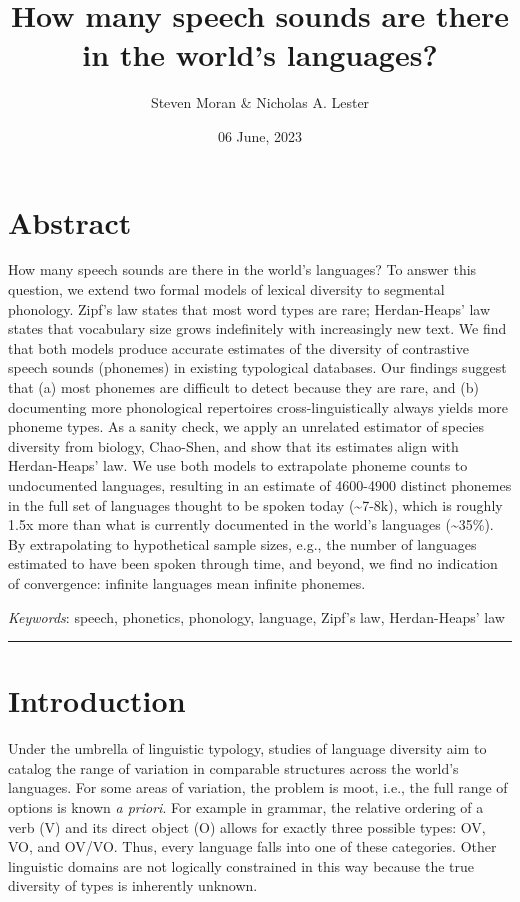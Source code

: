 \documentclass[
]{article}
\title{How many speech sounds are there in the world's languages?}
\author{Steven Moran \& Nicholas A. Lester}
\date{06 June, 2023}
\begin{document}
\maketitle

\hypertarget{abstract}{%
\section*{Abstract}\label{abstract}}

How many speech sounds are there in the world's languages? To answer
this question, we extend two formal models of lexical diversity to
segmental phonology. Zipf's law states that most word types are rare;
Herdan-Heaps' law states that vocabulary size grows indefinitely with
increasingly new text. We find that both models produce accurate
estimates of the diversity of contrastive speech sounds (phonemes) in
existing typological databases. Our findings suggest that (a) most
phonemes are difficult to detect because they are rare, and (b)
documenting more phonological repertoires cross-linguistically always
yields more phoneme types. As a sanity check, we apply an unrelated
estimator of species diversity from biology, Chao-Shen, and show that
its estimates align with Herdan-Heaps' law. We use both models to
extrapolate phoneme counts to undocumented languages, resulting in an
estimate of 4600-4900 distinct phonemes in the full set of languages
thought to be spoken today (\textasciitilde7-8k), which is roughly 1.5x
more than what is currently documented in the world's languages
(\textasciitilde35\%). By extrapolating to hypothetical sample sizes,
e.g., the number of languages estimated to have been spoken through
time, and beyond, we find no indication of convergence: infinite
languages mean infinite phonemes.

\emph{Keywords}: speech, phonetics, phonology, language, Zipf's law,
Herdan-Heaps' law

\begin{center}\rule{0.5\linewidth}{0.5pt}\end{center}

\hypertarget{introduction}{%
\section{Introduction}\label{introduction}}

Under the umbrella of linguistic typology, studies of language diversity
aim to catalog the range of variation in comparable structures across
the world's languages. For some areas of variation, the problem is moot,
i.e., the full range of options is known \emph{a priori}. For example in
grammar, the relative ordering of a verb (V) and its direct object (O)
allows for exactly three possible types: OV, VO, and OV/VO. Thus, every
language falls into one of these categories. Other linguistic domains
are not logically constrained in this way because the true diversity of
types is inherently unknown.
\end{document}
